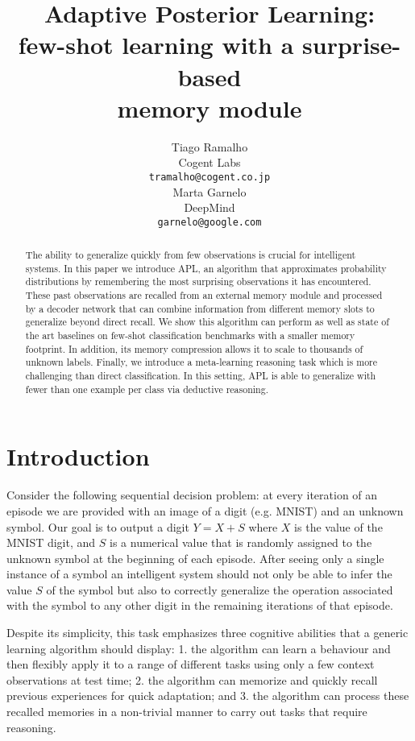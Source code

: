\documentclass{article} \usepackage{iclr2019_conference,times}
\title{Adaptive Posterior Learning: \\few-shot learning with a surprise-based \\ memory module}
\author{Tiago Ramalho \\
Cogent Labs \\
\texttt{tramalho@cogent.co.jp} \\
\And
Marta Garnelo \\
DeepMind \\
\texttt{garnelo@google.com} \\
}
\begin{document}
\maketitle

\begin{abstract}




The ability to generalize quickly from few observations is crucial for intelligent systems. In this paper we introduce APL, an algorithm that approximates probability distributions by remembering the most surprising observations it has encountered.
These past observations are recalled from an external memory module and  processed by a decoder network that can combine information from different memory slots to generalize beyond direct recall.
We show this algorithm can perform as well as state of the art baselines on few-shot classification benchmarks with a smaller memory footprint. 
In addition, its memory compression allows it to scale to thousands of unknown labels. 
Finally, we introduce a meta-learning reasoning task which is more challenging than direct classification. In this setting, APL is able to generalize with fewer than one example per class via deductive reasoning.
\end{abstract}

\section{Introduction}
Consider the following sequential decision problem: at every iteration of an episode we are provided with an image of a digit (e.g. MNIST) and an unknown symbol. Our goal is to output a digit $Y=X+S$ where $X$ is the value of the MNIST digit, and $S$ is a numerical value that is randomly assigned to the unknown symbol at the beginning of each episode. After seeing only a single instance of a symbol an intelligent system should not only be able to infer the value $S$ of the symbol but also to correctly generalize the operation associated with the symbol to any other digit in the remaining iterations of that episode.

Despite its simplicity, this task emphasizes three cognitive abilities that a generic learning algorithm should display: 1$.$ the algorithm can learn a behaviour and then flexibly apply it to a range of different tasks using only a few context observations at test time; 2$.$ the algorithm can memorize and quickly recall previous experiences for quick adaptation; and 3$.$ the algorithm can process these recalled memories in a non-trivial manner to carry out tasks that require reasoning.
\end{document}

